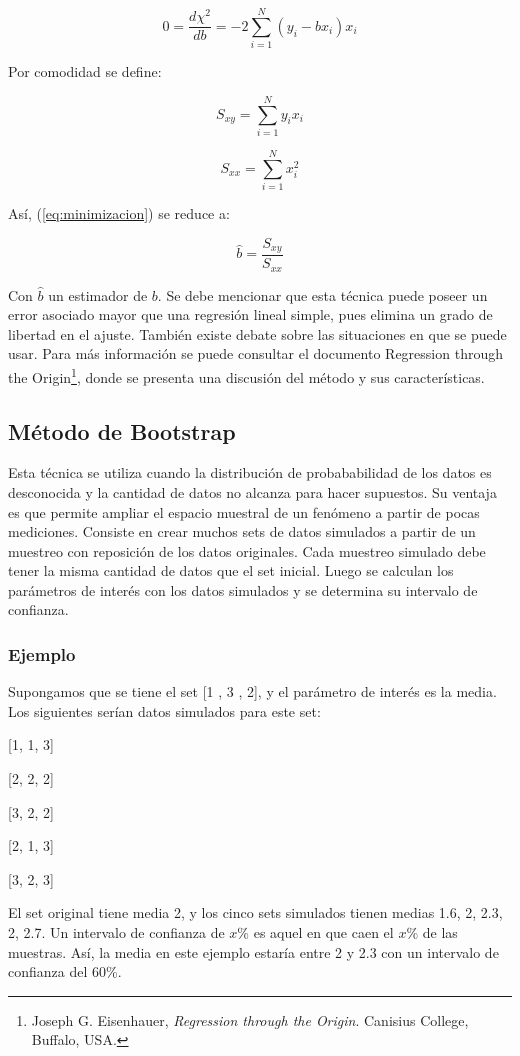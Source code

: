 \documentclass{article}
\begin{document}
\begin{equation}
  0 = \dfrac{d \chi^2}{d b} = - 2 \sum_{i=1}^{N} (y_i - b x_i)x_i
  \label{eq:minimizacion}
\end{equation}

Por comodidad se define:


$$S_{xy} = \sum_{i=1}^{N} y_i x_i$$

$$S_{xx} = \sum_{i=1}^{N} x_i ^ 2$$

Así, (\ref{eq:minimizacion}) se reduce a:

\begin{equation}
  \hat{b} = \dfrac{S_{xy}}{S_{xx}}
\end{equation} 

Con $\hat{b}$ un estimador de $b$. Se debe mencionar que esta técnica puede poseer un error asociado mayor que una regresión lineal simple, pues elimina un grado de libertad en el ajuste. También existe debate sobre las situaciones en que se puede usar. Para más información se puede consultar el documento Regression through the Origin\footnote{Joseph G. Eisenhauer, \emph{Regression through the Origin}. Canisius College, Buffalo, USA.}, donde se presenta una discusión del método y sus características.

\clearpage
\subsection{Método de Bootstrap}
\label{sec:bootstrap}

Esta técnica se utiliza cuando la distribución de probababilidad de los datos es desconocida y la cantidad de datos no alcanza para hacer supuestos. Su ventaja es que permite ampliar el espacio muestral de un fenómeno a partir de pocas mediciones. Consiste en crear muchos sets de datos simulados a partir de un muestreo con reposición de los datos originales. Cada muestreo simulado debe tener la misma cantidad de datos que el set inicial. Luego se calculan los parámetros de interés con los datos simulados y se determina su intervalo de confianza.

\subsubsection*{Ejemplo}
Supongamos que se tiene el set [1 , 3 , 2], y el parámetro de interés es la media. Los siguientes serían datos simulados para este set:

\begin{center}
  [1, 1, 3]

  [2, 2, 2]

  [3, 2, 2]

  [2, 1, 3]

  [3, 2, 3]

\end{center}
  

El set original tiene media 2, y los cinco sets simulados tienen medias 1.6, 2, 2.3, 2, 2.7. Un intervalo de confianza de $x\%$ es aquel en que caen el $x\%$ de las muestras. Así, la media en este ejemplo estaría entre 2 y 2.3 con un intervalo de confianza del 60\%.
\end{document}
